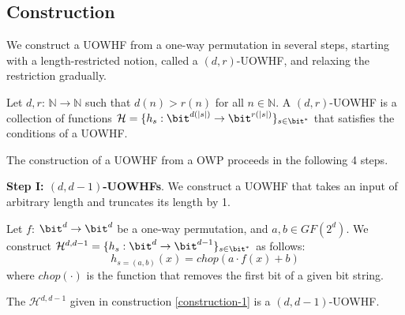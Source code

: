\subsection{Construction}
We construct a UOWHF from a one-way permutation in several steps, starting with a length-restricted notion, called a $(d,r)$-UOWHF, and relaxing the restriction gradually. 

\begin{definition}[$(d,r)$-UOWHFs]
Let $d,r$: $\mathbb{N}\rightarrow\mathbb{N}$ such that $d(n) > r(n)$ for all $n \in \mathbb{N}$. A $(d,r)$-UOWHF is a collection of functions $\mathcal{H} = \{h_s: \bit^{d(|s|)}\rightarrow\bit^{r(|s|)}\}_{s\in\bit^{*}}$ that satisfies the conditions of a UOWHF.
\end{definition}

The construction of a UOWHF from a OWP proceeds in the following 4 steps.

\noindent\textbf{Step I: $(d, d-1)$-UOWHFs}.
We construct a UOWHF that takes an input of arbitrary length and truncates its length by 1. 
\begin{construction}\label{construction-1}
    Let $f$: $\bit^{d}\rightarrow\bit^{d}$ be a one-way permutation, and $a,b\in GF(2^d)$. We construct $\mathcal{H}^{d, d-1} = \{h_s: \bit^{d}\rightarrow\bit^{d-1}\}_{s \in \bit^*}$ as follows: 
    \[
        h_{s=(a,b)}(x)=chop(a\cdot f(x)+b)
    \]
    where $chop(\cdot)$ is the function that removes the first bit of a given bit string. 
\end{construction}

\begin{claim}
    The $\mathcal{H}^{d, d-1}$ given in construction \ref{construction-1} is a $(d,d-1)$-UOWHF.
\end{claim} 

